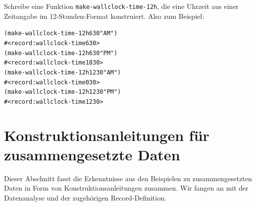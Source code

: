 \begin{aufgabe}
  Schreibe eine Funktion \texttt{make-wallclock-time-12h}, die eine
  Uhrzeit aus einer Zeitangabe im 12-Stunden-Format konstruiert.  Also
  zum Beispiel:
\begin{alltt}
(make-wallclock-time-12h 6 30 "AM")
\evalsto{} #<record:wallclock-time 6 30>
(make-wallclock-time-12h 6 30 "PM")
\evalsto{} #<record:wallclock-time 18 30>
(make-wallclock-time-12h 12 30 "AM")
\evalsto{} #<record:wallclock-time 0 30>
(make-wallclock-time-12h 12 30 "PM")
\evalsto{} #<record:wallclock-time 12  30>
\end{alltt}
\end{aufgabe}

\section{Konstruktionsanleitungen für zusammengesetzte Daten}

Dieser Abschnitt fasst die Erkenntnisse aus den Beispielen
zu zusammengesetzten Daten in Form von Konstruktionsanleitungen
zusammen.  Wir fangen an mit der Datenanalyse und der zugehörigen
Record-Definition.

